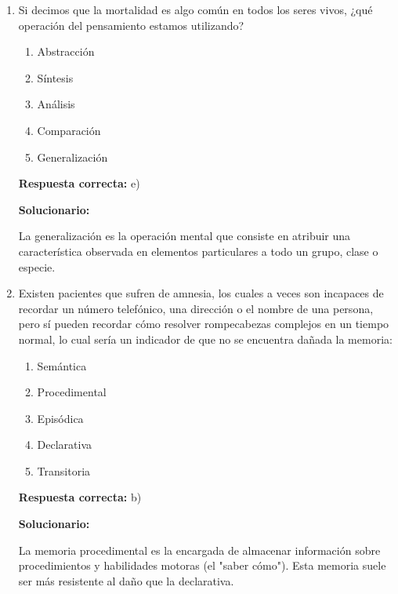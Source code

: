 \begin{enumerate}[resume]
	\item Si decimos que la mortalidad es algo común en todos los seres vivos, ¿qué operación del pensamiento estamos utilizando?
	\begin{enumerate}[label=\alph*)]
		\item Abstracción
		\item Síntesis
		\item Análisis
		\item Comparación
		\item Generalización
	\end{enumerate}
	\textbf{Respuesta correcta:} e)

	\vspace{2mm}
	\textbf{Solucionario:}

	La generalización es la operación mental que consiste en atribuir una característica observada en elementos particulares a todo un grupo, clase o especie.

	\vspace{6mm}

	\item Existen pacientes que sufren de amnesia, los cuales a veces son incapaces de recordar un número telefónico, una dirección o el nombre de una persona, pero sí pueden recordar cómo resolver rompecabezas complejos en un tiempo normal, lo cual sería un indicador de que no se encuentra dañada la memoria:
	\begin{enumerate}[label=\alph*)]
		\item Semántica
		\item Procedimental
		\item Episódica
		\item Declarativa
		\item Transitoria
	\end{enumerate}
	\textbf{Respuesta correcta:} b)

	\vspace{2mm}
	\textbf{Solucionario:}

	La memoria procedimental es la encargada de almacenar información sobre procedimientos y habilidades motoras (el "saber cómo"). Esta memoria suele ser más resistente al daño que la declarativa.

	\vspace{6mm}


\end{enumerate}
